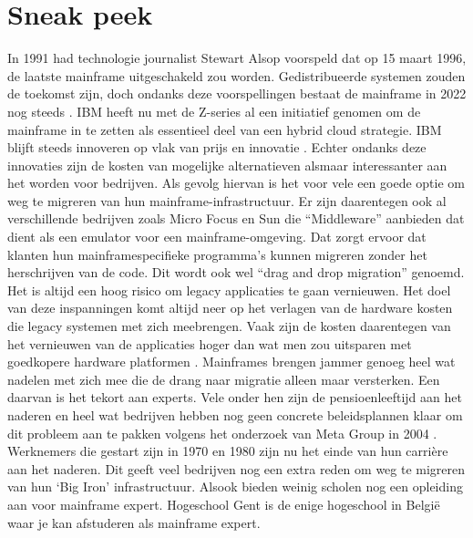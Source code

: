 
\section{Sneak peek}
\label{sec:state-of-the-art}
In 1991 had technologie journalist Stewart Alsop voorspeld dat op 15 maart 1996, de laatste mainframe uitgeschakeld zou worden. Gedistribueerde systemen zouden de toekomst zijn, doch ondanks deze voorspellingen bestaat de mainframe in 2022 nog steeds \autocite{Barnett2005}. IBM heeft nu met de Z-series al een initiatief genomen om de mainframe in te zetten als essentieel deel van een hybrid cloud strategie. IBM blijft steeds innoveren op vlak van prijs en innovatie \autocite{Smolaks2021}. Echter ondanks deze innovaties zijn de kosten van mogelijke alternatieven alsmaar interessanter aan het worden voor bedrijven. Als gevolg hiervan is het voor vele een goede optie om weg te migreren van hun mainframe-infrastructuur. Er zijn daarentegen ook al verschillende bedrijven zoals Micro Focus en Sun die “Middleware” aanbieden dat dient als een emulator voor een mainframe-omgeving. Dat zorgt ervoor dat klanten hun mainframespecifieke programma’s kunnen migreren zonder het herschrijven van de code. Dit wordt ook wel “drag and drop migration” genoemd. Het is altijd een hoog risico om legacy applicaties te gaan vernieuwen. Het doel van deze inspanningen komt altijd neer op het verlagen van de hardware kosten die legacy systemen met zich meebrengen. Vaak zijn de kosten daarentegen van het vernieuwen van de applicaties hoger dan wat men zou uitsparen met goedkopere hardware platformen \autocite{Bingell2014}. Mainframes brengen jammer genoeg heel wat nadelen met zich mee die de drang naar migratie alleen maar versterken. Een daarvan is het tekort aan experts. Vele onder hen zijn de pensioenleeftijd aan het naderen en heel wat bedrijven hebben nog geen concrete beleidsplannen klaar om dit probleem aan te pakken volgens het onderzoek van Meta Group in 2004 \autocite{Bakker2006}. Werknemers die gestart zijn in 1970 en 1980 zijn nu het einde van hun carrière aan het naderen. Dit geeft veel bedrijven nog een extra reden om weg te migreren van hun ‘Big Iron’ infrastructuur. Alsook bieden weinig scholen nog een opleiding aan voor mainframe expert. Hogeschool Gent is de enige hogeschool in België waar je kan afstuderen als mainframe expert.

 

